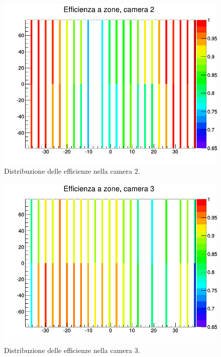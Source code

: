 \documentclass[8pt]{extarticle}
\begin{document}
\begin{figure}[!]
\begin{center}
\includegraphics[scale=0.3]{eff_zone2}
\caption{Distribuzione delle efficienze nella camera 2.}
\label{fig:eff_zone2}
\end{center}
\end{figure}

\begin{figure}[!]
\begin{center}
\includegraphics[scale=0.3]{eff_zone3}
\caption{Distribuzione delle efficienze nella camera 3.}
\label{fig:eff_zone3}
\end{center}
\end{figure}
\end{document}
